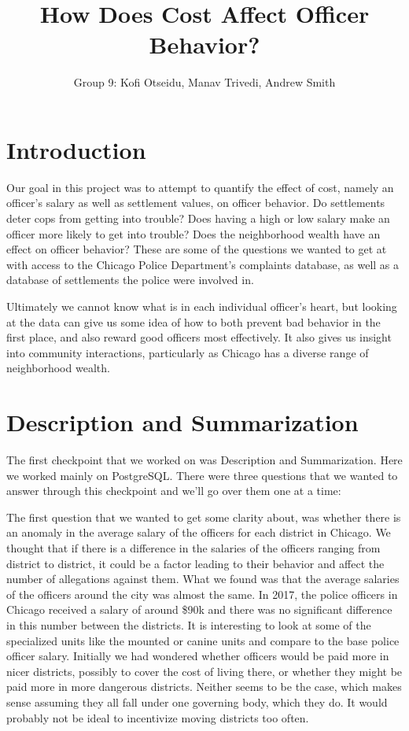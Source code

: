 \documentclass[11pt]{article}
\author{Group 9: Kofi Otseidu, Manav Trivedi, Andrew Smith}
\title{How Does Cost Affect Officer Behavior?}
\begin{document}
\maketitle


\section{Introduction}
Our goal in this project was to attempt to quantify the effect of cost, namely an officer's salary as well as settlement values, on officer behavior. Do settlements deter cops from getting into trouble? Does having a high or low salary make an officer more likely to get into trouble? Does the neighborhood wealth have an effect on officer behavior? These are some of the questions we wanted to get at with access to the Chicago Police Department's complaints database, as well as a database of settlements the police were involved in.

Ultimately we cannot know what is in each individual officer's heart, but looking at the data can give us some idea of how to both prevent bad behavior in the first place, and also reward good officers most effectively. It also gives us insight into community interactions, particularly as Chicago has a diverse range of neighborhood wealth.


\section{Description and Summarization}
The first checkpoint that we worked on was Description and Summarization. Here we worked mainly on PostgreSQL. There were three questions that we wanted to answer through this checkpoint and we’ll go over them one at a time:

The first question that we wanted to get some clarity about, was whether there is an anomaly in the average salary of the officers for each district in Chicago. We thought that if there is a difference in the salaries of the officers ranging from district to district, it could be a factor leading to their behavior and affect the number of allegations against them. What we found was that the average salaries of the officers around the city was almost the same. In 2017, the police officers in Chicago received a salary of around \$90k and there was no significant difference in this number between the districts. It is interesting to look at some of the specialized units like the mounted or canine units and compare to the base police officer salary. Initially we had wondered whether officers would be paid more in nicer districts, possibly to cover the cost of living there, or whether they might be paid more in more dangerous districts. Neither seems to be the case, which makes sense assuming they all fall under one governing body, which they do. It would probably not be ideal to incentivize moving districts too often.
\end{document}
